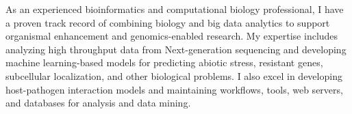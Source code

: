 As an experienced bioinformatics and computational biology professional, I have a proven track record of combining biology and big data analytics to support organismal enhancement and genomics-enabled research. My expertise includes analyzing high throughput data from Next-generation sequencing and developing machine learning-based models for predicting abiotic stress, resistant genes, subcellular localization, and other biological problems. I also excel in developing host-pathogen interaction models and maintaining workflows, tools, web servers, and databases for analysis and data mining.